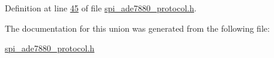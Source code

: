 Definition at line \hyperlink{a00041_source_l00045}{45} of file \hyperlink{a00041_source}{spi\-\_\-ade7880\-\_\-protocol.\-h}.



The documentation for this union was generated from the following file\-:\begin{DoxyCompactItemize}
\item 
\hyperlink{a00041}{spi\-\_\-ade7880\-\_\-protocol.\-h}\end{DoxyCompactItemize}
